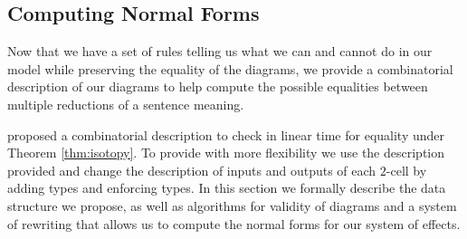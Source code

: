 \subsection{Computing Normal Forms}
Now that we have a set of rules telling us what we can and cannot do in our
model while preserving the equality of the diagrams, we provide a combinatorial
description of our diagrams to help compute the possible equalities between
multiple reductions of a sentence meaning.

\cite{delpeuchNormalizationPlanarString2022} proposed a combinatorial
description to check in linear time for equality under Theorem
\ref{thm:isotopy}.
To provide with more flexibility we use the description provided and change
the description of inputs and outputs of each $2$-cell by adding types and
enforcing types.
In this section we formally describe the data structure we propose, as well as
algorithms for validity of diagrams and a system of rewriting that allows us to
compute the normal forms for our system of effects.

